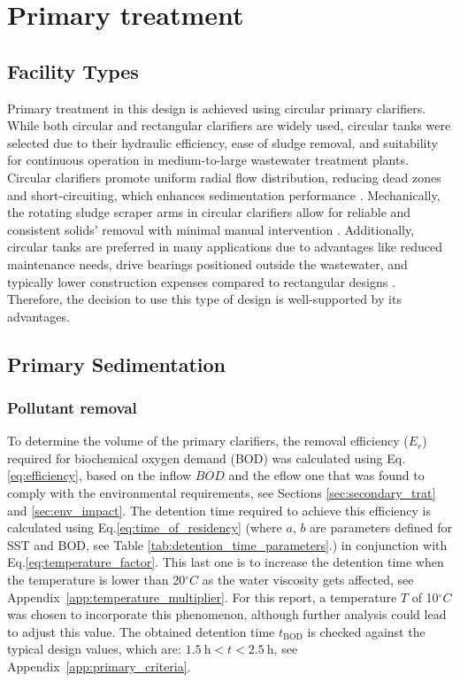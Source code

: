 \documentclass[11pt]{article}
\begin{document}
\section{Primary treatment}
\label{sec:primary_treat}

\subsection{Facility Types}
\label{sec:primary_facility_types}

Primary treatment in this design is achieved 
using circular primary clarifiers. While both 
circular and rectangular clarifiers are widely 
used, circular tanks were selected due to their 
hydraulic efficiency, ease of sludge removal, 
and suitability for continuous operation in 
medium-to-large wastewater treatment plants. 
Circular clarifiers promote uniform radial 
flow distribution, reducing dead zones and 
short-circuiting, which enhances sedimentation 
performance \cite{metcalf_2014_wastewater}. 
Mechanically, the rotating sludge scraper arms 
in circular clarifiers allow for reliable and consistent 
solids’ removal with minimal manual intervention \cite{davis2010water}. 
Additionally, circular tanks are preferred in 
many applications due to advantages like reduced 
maintenance needs, drive bearings positioned outside 
the wastewater, and typically lower construction 
expenses compared to rectangular designs \cite{davis2010water}. 
Therefore, the decision to use this type of design 
is well-supported by its advantages.

\subsection{Primary Sedimentation}
\label{sec:primary_Sedimentation_design}

\subsubsection{Pollutant removal}

To determine the volume of the primary clarifiers, the removal efficiency ($E_r$) required for biochemical oxygen demand (BOD) was calculated using Eq.\eqref{eq:efficiency}, based on the 
inflow $BOD$ and the eflow one that was found to comply with the environmental requirements, see Sections \ref{sec:secondary_trat} 
and \ref{sec:env_impact}. The detention time required to achieve this efficiency is calculated using Eq.\ref{eq:time_of_residency} (where \( a \), \( b \) are parameters defined for SST and BOD, see Table \ref{tab:detention_time_parameters}.) in conjunction with 
Eq.\ref{eq:temperature_factor}. This last one is to increase the detention time when the temperature is lower 
than 20$^{\circ}C$ as the water viscosity gets affected, see Appendix~\ref{app:temperature_multiplier}. For this report, a temperature $T$ of 10$^{\circ}C$ was 
chosen to incorporate this phenomenon, although further analysis could lead to adjust this value.
The obtained detention time $t_{\text{BOD}}$ is checked against the typical design values, which are: 
\(1.5~\text{h} < t < 2.5~\text{h}\), see Appendix~\ref{app:primary_criteria}.
\end{document}
